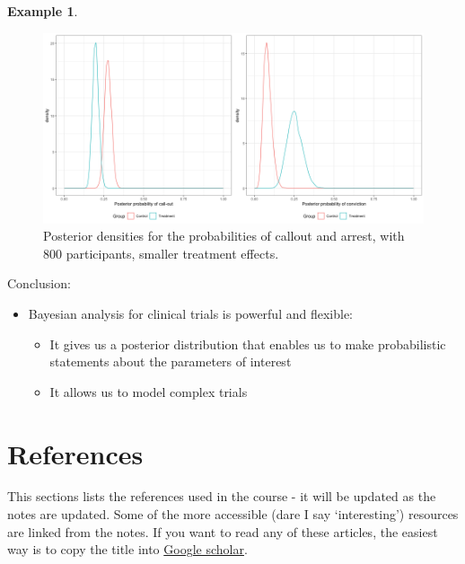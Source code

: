 \documentclass[
  openany]{book}
\providecommand{\tightlist}{%
  \setlength{\itemsep}{0pt}\setlength{\parskip}{0pt}}
\theoremstyle{definition}
\theoremstyle{definition}
\newtheorem{example}{Example}[chapter]
\theoremstyle{definition}
\theoremstyle{definition}
\theoremstyle{remark}
\begin{document}
\begin{example}
\begin{figure}
\includegraphics[width=1\linewidth]{images/ggpost800_55} \caption{Posterior densities for the probabilities of callout and arrest, with 800 participants, smaller treatment effects.}\label{fig:check800-55}
\end{figure}

\end{example}

Conclusion:

\begin{itemize}
\tightlist
\item
  Bayesian analysis for clinical trials is powerful and flexible:

  \begin{itemize}
  \tightlist
  \item
    It gives us a posterior distribution that enables us to make probabilistic statements about the parameters of interest
  \item
    It allows us to model complex trials
  \end{itemize}
\end{itemize}

\chapter*{References}\label{references}

This sections lists the references used in the course - it will be updated as the notes are updated. Some of the more accessible (dare I say `interesting') resources are linked from the notes. If you want to read any of these articles, the easiest way is to copy the title into \href{https://scholar.google.co.uk/}{Google scholar}.

  
\end{document}
